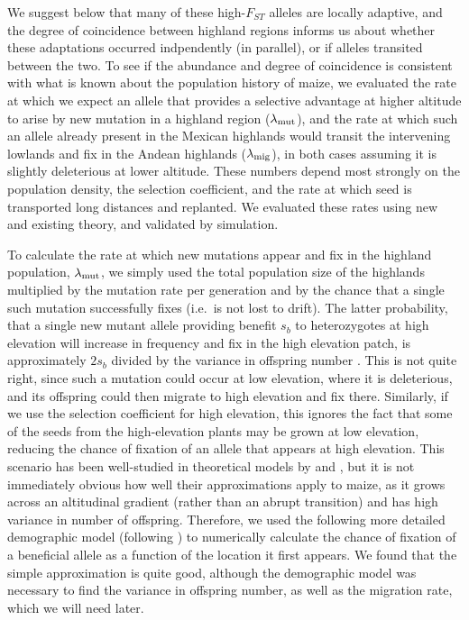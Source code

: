 We suggest below that many of these high-$F_{ST}$ alleles are locally adaptive,
and the degree of coincidence between highland regions informs us about 
whether these adaptations occurred indpendently (in parallel), or if alleles transited between the two.
To see if the abundance and degree of coincidence is consistent with what is known about the population history of maize,
we evaluated the rate at which we expect an allele that provides a selective advantage at higher altitude
to arise by new mutation in a highland region ($\lambda_{\text{mut}}$),
and the rate at which such an allele already present in the Mexican highlands
would transit the intervening lowlands and fix in the Andean highlands ($\lambda_{\text{mig}}$),
in both cases assuming it is slightly deleterious at lower altitude.
These numbers depend most strongly on the population density, 
the selection coefficient,
and the rate at which seed is transported long distances and replanted.
We evaluated these rates using new and existing theory, and validated by simulation.


To calculate the rate at which new mutations appear and fix in the highland population, $\lambda_{\text{mut}}$,
we simply used the total population size of the highlands
multiplied by the mutation rate per generation
and by the chance that a single such mutation successfully fixes
(i.e.\ is not lost to drift).
The latter probability, that a single new mutant allele providing benefit $s_b$ to heterozygotes at high elevation
will increase in frequency and fix in the high elevation patch,
is approximately $2s_b$ divided by the variance in offspring number \citep{jagers1975branching}.
This is not quite right, since such a mutation could occur at low elevation,
where it is deleterious,
and its offspring could then migrate to high elevation and fix there.
Similarly, if we use the selection coefficient for high elevation,
this ignores the fact that some of the seeds from the high-elevation plants may be grown at low elevation,
reducing the chance of fixation of an allele that appears at high elevation.
This scenario has been well-studied in theoretical models by \citet{polk} and \citet{barton1987establishment},
but it is not immediately obvious how well their approximations apply to maize,
as it grows across an altitudinal gradient (rather than an abrupt transition) and has high variance in number of offspring.
Therefore, we used the following more detailed demographic model (following \citet{vanHeerwaarden2010}) 
to numerically calculate the chance of fixation of a beneficial allele
as a function of the location it first appears.
We found that the simple approximation is quite good,
although the demographic model was necessary to find the variance in offspring number,
as well as the migration rate, which we will need later.

